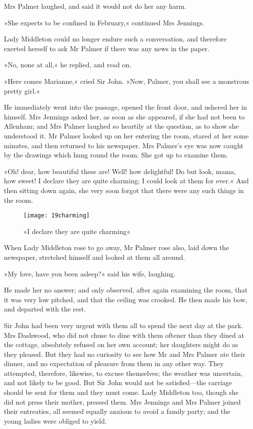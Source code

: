 Mrs Palmer laughed, and said it would not do her any harm.

»She expects to be confined in February,« continued Mrs Jennings.

Lady Middleton could no longer endure such a conversation, and therefore exerted herself to ask Mr Palmer if there was any news in the paper.

»No, none at all,« he replied, and read on.

»Here comes Marianne,« cried Sir John. »Now, Palmer, you shall see a monstrous pretty girl.«

He immediately went into the passage, opened the front door, and ushered her in himself. Mrs Jennings asked her, as soon as she appeared, if she had not been to Allenham; and Mrs Palmer laughed so heartily at the question, as to show she understood it. Mr Palmer looked up on her entering the room, stared at her some minutes, and then returned to his newspaper. Mrs Palmer’s eye was now caught by the drawings which hung round the room. She got up to examine them.

»Oh! dear, how beautiful these are! Well! how delightful! Do but look, mama, how sweet! I declare they are quite charming; I could look at them for ever.« And then sitting down again, she very soon forgot that there were any such things in the room.

\begin{figure}[tbph]
\centering
\texttt{[image: 19charming]}
\caption{»I declare they are quite charming«}
\end{figure}

When Lady Middleton rose to go away, Mr Palmer rose also, laid down the newspaper, stretched himself and looked at them all around.

»My love, have you been asleep?« said his wife, laughing.

He made her no answer; and only observed, after again examining the room, that it was very low pitched, and that the ceiling was crooked. He then made his bow, and departed with the rest.

Sir John had been very urgent with them all to spend the next day at the park. Mrs Dashwood, who did not chuse to dine with them oftener than they dined at the cottage, absolutely refused on her own account; her daughters might do as they pleased. But they had no curiosity to see how Mr and Mrs Palmer ate their dinner, and no expectation of pleasure from them in any other way. They attempted, therefore, likewise, to excuse themselves; the weather was uncertain, and not likely to be good. But Sir John would not be satisfied—the carriage should be sent for them and they must come. Lady Middleton too, though she did not press their mother, pressed them. Mrs Jennings and Mrs Palmer joined their entreaties, all seemed equally anxious to avoid a family party; and the young ladies were obliged to yield.

